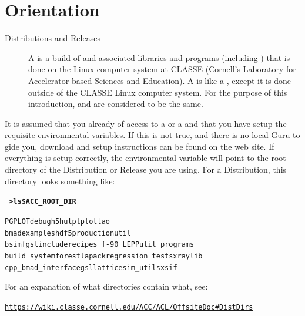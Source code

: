 \documentclass{hitec}
\newcommand{\BF}[1]{{\normalfont\textbf{#1}}}
\begin{document}
\section{Orientation}

  \begin{description}
  \item[Distributions and Releases] \Newline
A  is a build of \bmad and associated libraries and programs (including \tao)
that is done on the Linux computer system at CLASSE (Cornell's Laboratory for
Accelerator-based Sciences and Education). A  is like a ,
except it is done outside of the CLASSE Linux computer system.  For the purpose
of this introduction,  and  are considered to be the same.
  \end{description}

It is assumed that you already of access to a  or a  and that
you have setup the requisite environmental variables. If this is not true, and there is no
local Guru to gide you, download and setup instructions can be found on the \bmad web
site. If everything is setup correctly, the environmental variable  will
point to the root directory of the Distribution or Release you are using. For a
Distribution, this directory looks something like:
\begin{alltt}
  \BF{~> ls \$ACC_ROOT_DIR}

  PGPLOT                debug       h5hut        plplot                tao
  bmad                  examples    hdf5         production            util
  bsim                  fgsl        include      recipes_f-90_LEPP     util_programs
  build_system          forest      lapack       regression_tests      xraylib
  cpp_bmad_interface    gsl         lattice      sim_utils             xsif
\end{alltt}

For an expanation of what directories contain what, see:
\begin{alltt}
  \url{https://wiki.classe.cornell.edu/ACC/ACL/OffsiteDoc#DistDirs}
\end{alltt}
\end{document}
